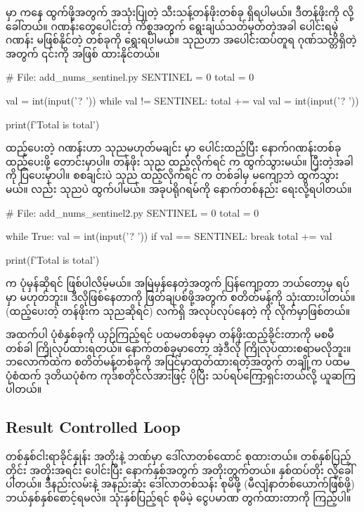  မှာ  ကနေ ထွက်ဖို့အတွက် အသုံးပြုတဲ့ သီးသန့်တန်ဖိုးတစ်ခု ရှိရပါမယ်။ ဒီတန်ဖိုးကို  လို့ ခေါ်တယ်။ ဂဏန်းတွေပေါင်းတဲ့ ကိစ္စအတွက်   ရွေးချယ်သတ်မှတ်တဲ့အခါ ပေါင်းရမဲ့ဂဏန်း မဖြစ်နိုင်တဲ့ တစ်ခုကို ရွေးရပါမယ်။ သုညဟာ ‌အပေါင်းထပ်တူရ ဂုဏ်သတ္တိရှိတဲ့အတွက် ၎င်းကို  အဖြစ် ထားနိုင်တယ်။
%
\begin{py}
# File: add_nums_sentinel.py 
SENTINEL = 0
total = 0

val = int(input('? '))
while val != SENTINEL:
    total += val
    val = int(input('? '))

print(f'Total is {total}')
\end{py}
%
ထည့်ပေးတဲ့ ဂဏန်းဟာ သုညမဟုတ်မချင်း  မှာ ပေါင်းထည့်ပြီး နောက်ဂဏန်းတစ်ခု ထည့်ပေးဖို့  တောင်းမှာပါ။  တန်ဖိုး သုည ထည့်လိုက်ရင်  က ထွက်သွားမယ်။ ပြီးတဲ့အခါ  ကို ပြပေးမှာပါ။ စစချင်းပဲ သုည ထည့်လိုက်ရင်  က တစ်ခါမှ မကျော့ဘဲ ထွက်သွားမယ်။  လည်း သုညပဲ ထွက်ပါမယ်။ အခုပရိုဂရမ်ကို နောက်တစ်နည်း ရေးလို့ရပါတယ်။ 
%
\begin{py}
# File: add_nums_sentinel2.py 
SENTINEL = 0
total = 0

while True:
    val = int(input('? '))
    if val == SENTINEL:
        break
    total += val

print(f'Total is {total}')

\end{py}
%

 က ပုံမှန်ဆိုရင်  ဖြစ်ပါလိမ့်မယ်။ အမြဲမှန်နေတဲ့အတွက် ပြန်ကျော့တာ ဘယ်တော့မှ ရပ်မှာ မဟုတ်ဘူး။ ဒီလိုဖြစ်နေတာကို ဖြတ်ချပစ်ဖို့အတွက်  စတိတ်မန့်ကို သုံးထားပါတယ်။  (ထည့်ပေးတဲ့ တန်ဖိုးက သုညဆိုရင်) လက်ရှိ အလုပ်လုပ်နေတဲ့  ကို  လိုက်မှာဖြစ်တယ်။ 

အထက်ပါ  ပုံစံနှစ်ခုကို ယှဉ်ကြည့်ရင်  ပထမတစ်ခုမှာ  တန်ဖိုးထည့်ခိုင်းတာကို  မစမီ တစ်ခါ ကြိုလုပ်ထားရတယ်။ နောက်တစ်ခုမှာတော့ အဲ့ဒီလို ကြိုလုပ်ထားစရာမလိုဘူး။  ဘလောက်ထဲက စတိတ်မန့်တစ်ခုကို အပြင်မှာထုတ်ထားရတဲ့အတွက် တချို့က ပထမပုံစံထက် ဒုတိယပုံစံက ကုဒ်စတိုင်လ်အားဖြင့် ပိုပြီး သပ်ရပ်ကြော့ရှင်းတယ်လို့ ယူဆကြပါတယ်။

\subsection*{Result Controlled Loop}

တစ်နှစ်ငါးရာခိုင်နှုန်း အတိုးနဲ့ ဘဏ်မှာ ဒေါ်လာတစ်ထောင် စုထားတယ်။ တစ်နှစ်ပြည့်တိုင်း အတိုးအရင်း ပေါင်းပြီး နောက်နှစ်အတွက် အတိုးတွက်တယ်။ နှစ်ထပ်တိုး  လို့ခေါ်ပါတယ်။ ဒီနည်းလမ်းနဲ့ အနည်းဆုံး ဒေါ်လာတစ်သန်း စုမိဖို့ (မီလျံနာတစ်ယောက်ဖြစ်ဖို့) ဘယ်နှစ်နှစ်စောင့်ရမလဲ။ သုံးနှစ်ပြည့်ရင် စုမိမဲ့ ငွေပမာဏ တွက်ထားတာကို ကြည့်ပါ။


